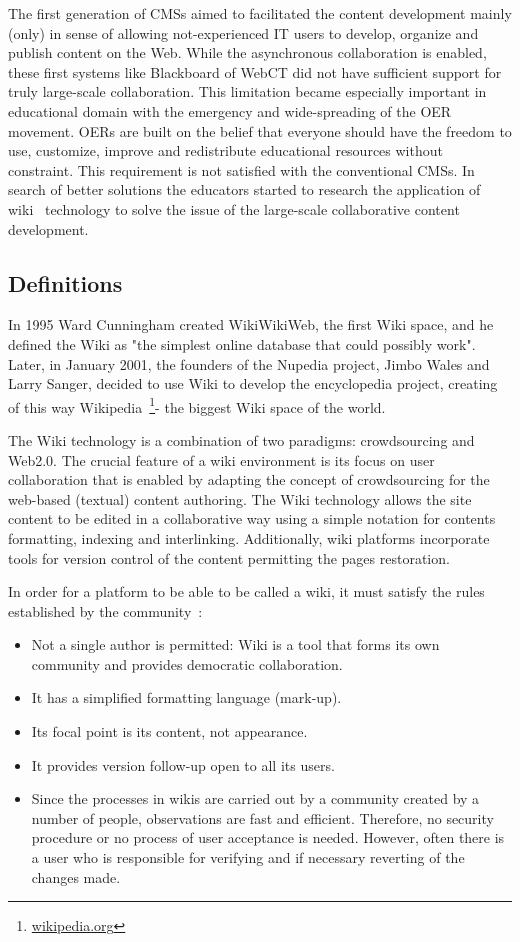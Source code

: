 \documentclass[ngerman,UKenglish,table]{scrbook}
\begin{document}
The first generation of CMSs aimed to facilitated the content development mainly (only) in sense of allowing not-experienced IT users to develop, organize and publish content on the Web. 
While the asynchronous collaboration is enabled, these first systems like Blackboard of WebCT did not have sufficient support for truly large-scale collaboration.
This limitation became especially important in educational domain with the emergency and wide-spreading of the OER movement.
OERs are built on the belief that everyone should have the freedom to use, customize, improve and redistribute educational resources without constraint. 
This requirement is not satisfied with the conventional CMSs.
In search of better solutions the educators started to research the application of wiki~\cite{LeufCunningham2001} technology to solve the issue of the large-scale collaborative content development.


\subsection{Definitions}

In 1995 Ward Cunningham created WikiWikiWeb, the first Wiki space, and he defined the Wiki as "the simplest online database that could possibly work".
Later, in January 2001, the founders of the Nupedia project, Jimbo Wales and Larry Sanger, decided to use Wiki to develop the encyclopedia project, creating of this way Wikipedia~\footnote{\url{wikipedia.org}}- the biggest Wiki space of the world.

The Wiki technology is a combination of two paradigms: crowdsourcing and Web2.0.
The crucial feature of a wiki environment is its focus on user collaboration that is enabled by adapting the concept of crowdsourcing for the web-based (textual) content authoring. 
The Wiki technology allows the site content to be edited in a collaborative way using a simple notation for contents formatting, indexing and interlinking.
Additionally, wiki platforms incorporate tools for version control of the content permitting the pages restoration.

In order for a platform to be able to be called a wiki, it must satisfy the rules established by the community~\cite{Gokcearslan2011}:
\begin{itemize}
\item Not a single author is permitted: Wiki is a tool that forms its own community and provides democratic collaboration.
\item It has a simplified formatting language (mark-up).
\item Its focal point is its content, not appearance.
\item It provides version follow-up open to all its users.
\item Since the processes in wikis are carried out by a community created by a number of people, observations are fast and efficient.
Therefore, no security procedure or no process of user acceptance is needed.
However, often there is a user who is responsible for verifying and if necessary reverting of the changes made.
\end{itemize}
\end{document}
